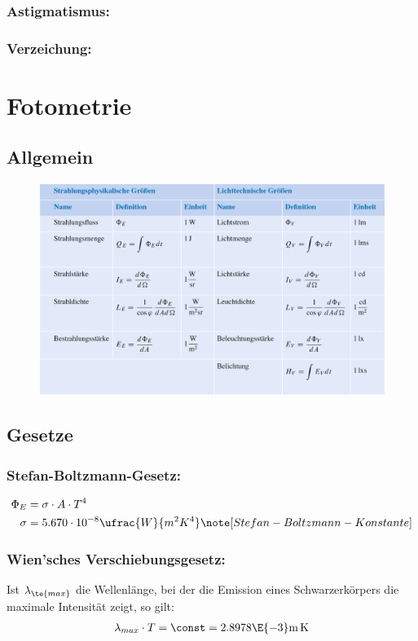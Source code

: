 \documentclass[twocolumn, unnumberedsubsub]{summery}
\begin{document}
\subsubsection*{Astigmatismus:}
\subsubsection*{Verzeichung:}

\section{Fotometrie}
\subsection{Allgemein}
\begin{figure}[H]
    \centering
    \includegraphics[width=.5\textwidth]{1.png}
\end{figure}

\subsection{Gesetze}
\subsubsection{Stefan-Boltzmann-Gesetz:}\tight
    \begin{align*}
        \Phi_E &= \sigma \cdot A \cdot T^4\\
        \sigma &= 5.670 \cdot10^{-8} \ufrac{W}{m^2K^4}\note[Stefan-Boltzmann-Konstante]
    \end{align*}

\subsubsection{Wien'sches Verschiebungsgesetz:}
    Ist \(\lambda_{\te{max}}\) die Wellenlänge, bei der die Emission eines Schwarzerkörpers
    die maximale Intensität zeigt, so gilt:
    \begin{align*}
        \lambda_{max}\cdot T = \const = 2.8978 \E{-3} \mathrm{m\, K}
    \end{align*}
\end{document}
